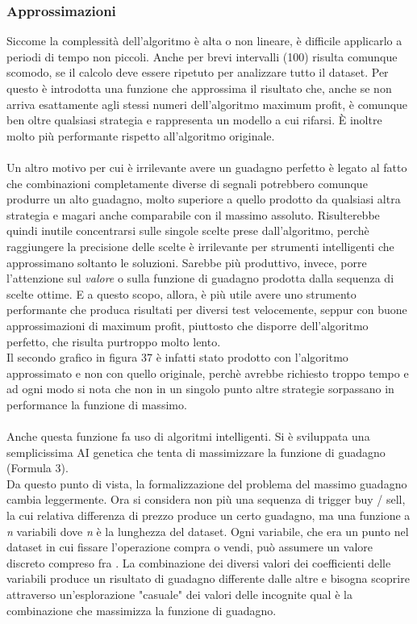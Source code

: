 \documentclass[a4paper,12pt]{report}
\begin{document}
\begin{fig}
\subsubsection{Approssimazioni}
Siccome la complessità dell'algoritmo è alta o non lineare, è difficile applicarlo a periodi di tempo non piccoli. Anche per brevi intervalli (100) risulta comunque scomodo, se il calcolo deve essere ripetuto per analizzare tutto il dataset. Per questo è introdotta una funzione che approssima il risultato che, anche se non arriva esattamente agli stessi numeri dell'algoritmo maximum profit, è comunque ben oltre qualsiasi strategia e rappresenta un modello a cui rifarsi. È inoltre molto più performante rispetto all'algoritmo originale.\\~\\
Un altro motivo per cui è irrilevante avere un guadagno perfetto è legato al fatto che combinazioni completamente diverse di segnali potrebbero comunque produrre un alto guadagno, molto superiore a quello prodotto da qualsiasi altra strategia e magari anche comparabile con il massimo assoluto. Risulterebbe quindi inutile concentrarsi sulle singole scelte prese dall'algoritmo, perchè raggiungere la precisione delle scelte è irrilevante per strumenti intelligenti che approssimano soltanto le soluzioni. Sarebbe più produttivo, invece, porre l'attenzione sul \textit{valore} o sulla funzione di guadagno prodotta dalla sequenza di scelte ottime. E a questo scopo, allora, è più utile avere uno strumento performante che produca risultati per diversi test velocemente, seppur con buone approssimazioni di maximum profit, piuttosto che disporre dell'algoritmo perfetto, che risulta purtroppo molto lento.\\ Il secondo grafico in figura 37 è infatti stato prodotto con l'algoritmo approssimato e non con quello originale, perchè avrebbe richiesto troppo tempo e ad ogni modo si nota che non in un singolo punto altre strategie sorpassano in performance la funzione di massimo.\\~\\ 
Anche questa funzione fa uso di algoritmi intelligenti. Si è sviluppata una semplicissima AI genetica che tenta di massimizzare la funzione di guadagno (Formula 3).\\ Da questo punto di vista, la formalizzazione del problema del massimo guadagno cambia leggermente. Ora si considera non più una sequenza di trigger buy / sell, la cui relativa differenza di prezzo produce un certo guadagno, ma una funzione a \textit{n} variabili dove \textit{n} è la lunghezza del dataset. Ogni variabile, che era un punto nel dataset in cui fissare l'operazione compra o vendi, può assumere un valore discreto compreso fra \big[ -1, 0, 1 \big]. La combinazione dei diversi valori dei coefficienti delle variabili produce un risultato di guadagno differente dalle altre e bisogna scoprire attraverso un'esplorazione "casuale" dei valori delle incognite qual è la combinazione che massimizza la funzione di guadagno.

\end{fig}
\end{document}
